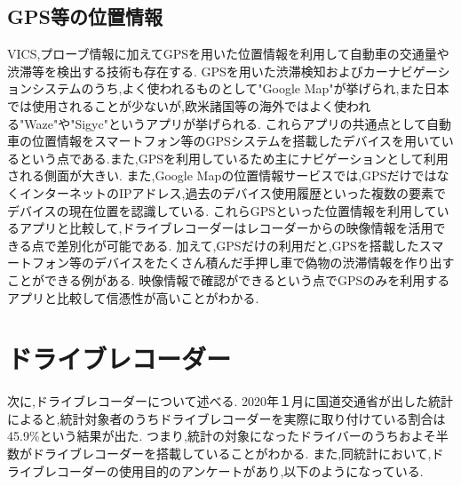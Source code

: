 
%
%

\subsection{GPS等の位置情報}
VICS,プローブ情報に加えてGPSを用いた位置情報を利用して自動車の交通量や渋滞等を検出する技術も存在する.
GPSを用いた渋滞検知およびカーナビゲーションシステムのうち,よく使われるものとして"Google Map"が挙げられ,また日本では使用されることが少ないが,欧米諸国等の海外ではよく使われる"Waze"\cite{Waze}や"Sigyc"\cite{Sigyc}というアプリが挙げられる.
これらアプリの共通点として自動車の位置情報をスマートフォン等のGPSシステムを搭載したデバイスを用いているという点である.また,GPSを利用しているため主にナビゲーションとして利用される側面が大きい.
また,Google Mapの位置情報サービスでは,GPSだけではなくインターネットのIPアドレス,過去のデバイス使用履歴といった複数の要素でデバイスの現在位置を認識している.\cite{google_map}
これらGPSといった位置情報を利用しているアプリと比較して,ドライブレコーダーはレコーダーからの映像情報を活用できる点で差別化が可能である.
加えて,GPSだけの利用だと,GPSを搭載したスマートフォン等のデバイスをたくさん積んだ手押し車で偽物の渋滞情報を作り出すことができる例がある.\cite{create_jam}
映像情報で確認ができるという点でGPSのみを利用するアプリと比較して信憑性が高いことがわかる.

\newpage
\section{ドライブレコーダー}
次に,ドライブレコーダーについて述べる.
2020年１月に国道交通省が出した統計\cite{ministryofland}によると,統計対象者のうちドライブレコーダーを実際に取り付けている割合は45.9\%という結果が出た.
つまり,統計の対象になったドライバーのうちおよそ半数がドライブレコーダーを搭載していることがわかる.
また,同統計において,ドライブレコーダーの使用目的のアンケートがあり,以下のようになっている.


